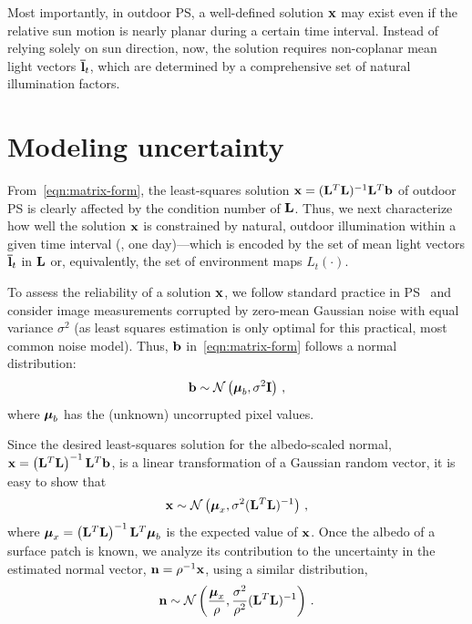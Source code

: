 Most importantly, in outdoor PS, a well-defined solution ${\bf x}$ may exist even if the relative sun motion is nearly planar during a certain time interval. Instead of relying solely on sun direction, now, the solution requires non-coplanar mean light vectors ${\bf \bar l}_t$, which are determined by a comprehensive set of natural illumination factors.

\section{Modeling uncertainty}
\label{sec:modeling_uncertainty}

From~\eqref{eqn:matrix-form}, the least-squares solution ${\bf x} = ({\bf L}^T{\bf L})^{-1}{\bf L}^T{\bf b}$ of outdoor PS is clearly affected by the condition number of ${\bf L}$. Thus, we next characterize how well the solution ${\bf x}$ is constrained by natural, outdoor illumination within a given time interval (\eg, one day)---which is encoded by the set of mean light vectors ${\bf \bar l}_t$ in ${\bf L}$ or, equivalently, the set of environment maps $L_t(\cdot)$.

To assess the reliability of a solution ${\bf x}$, we follow standard practice in PS~\cite{klaudiny-prl-14,sun-ivc-07} and consider image measurements corrupted by zero-mean Gaussian noise with equal variance $\sigma^2$ (as least squares estimation is only optimal for this practical, most common noise model). Thus, ${\bf b}$ in~\eqref{eqn:matrix-form} follows a normal distribution:
%
\begin{equation}
{\bf b} \sim \mathcal{N}\left( \boldsymbol \mu_b, \sigma^2 {\bf I} \right)\,,
\end{equation}
%
where $\boldsymbol \mu_b$ has the (unknown) uncorrupted pixel values.

Since the desired least-squares solution for the albedo-scaled normal, ${\bf x} = \left({\bf L}^T{\bf L}\right)^{-1}{\bf L}^T{\bf b}$, is a linear transformation of a Gaussian random vector, it is easy to show that
%
\begin{equation}
{\bf x} \sim \mathcal{N} \left( \boldsymbol \mu_x, \sigma^2({\bf L}^T{\bf L})^{-1} \right)\,,
\end{equation}
where $\boldsymbol \mu_x = \left({\bf L}^T{\bf L}\right)^{-1}{\bf L}^T\boldsymbol \mu_b$ is the expected value of ${\bf x}$.
Once the albedo of a surface patch is known, we analyze its contribution to the uncertainty in the estimated normal vector, ${\bf n} = \rho^{-1}{\bf x}$, using a similar distribution,
%
\begin{equation}
{\bf n} \sim \mathcal{N} \left( \frac{\boldsymbol \mu_x}{\rho}, \frac{\sigma^2}{\rho^2}({\bf L}^T{\bf L})^{-1} \right)\,.
\label{eqn:normal-distrib}
\end{equation}


